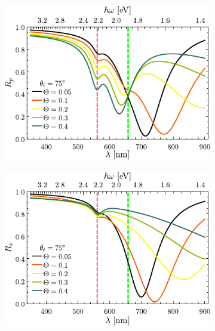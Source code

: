 \begin{figure}[h!]\centering\hspace*{-1.5em}
	\begin{subfigure}{.01\linewidth}\caption{}\label{sfig:R-ATR4-cutp}\vspace{4.75cm}\end{subfigure}
	\begin{subfigure}{.45\linewidth}\hspace*{-1.5em}
	\includegraphics[scale=.98]{2-Resultados/figs/1-Wp4ThetaVar/cut_angle_75_p.pdf}\end{subfigure}
	\begin{subfigure}{.01\linewidth}\caption{}\label{sfig:R-ATR4-cuts}\vspace{4.75cm}\end{subfigure}\hspace*{-1.em}
	\begin{subfigure}{.45\linewidth}\centering
	\includegraphics[scale=.98 ]{2-Resultados/figs/1-Wp4ThetaVar/cut_angle_75_s.pdf}\end{subfigure}\vspace*{-.5em}

\end{figure}
